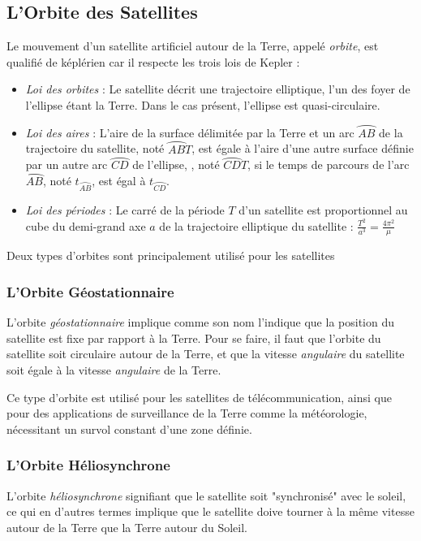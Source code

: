\documentclass[a4paper, 11pt]{report}
\begin{document}
\subsection{L'Orbite des Satellites}
Le mouvement d'un satellite artificiel autour de la Terre, appelé \emph{orbite}, est qualifié de képlérien car il respecte les trois lois de Kepler :
\begin{itemize}
	\item \emph{Loi des orbites} : Le satellite décrit une trajectoire elliptique, l'un des foyer de l'ellipse étant la Terre. Dans le cas présent, l'ellipse est quasi-circulaire.
	\item \emph{Loi des aires} : L'aire de la surface délimitée par la Terre et un arc $\wideparen{AB}$ de la trajectoire du satellite, noté $\wideparen{AB}T$, est égale à l'aire d'une autre surface définie par un autre arc $\wideparen{CD}$ de l'ellipse, , noté $\wideparen{CD}T$, si le temps de parcours de l'arc $\wideparen{AB}$, noté $t_{\wideparen{AB}}$, est égal à $t_{\wideparen{CD}}$.
	\item \emph{Loi des périodes} : Le carré de la période $T$ d'un satellite est proportionnel au cube du demi-grand axe $a$ de la trajectoire elliptique du satellite : $\frac{T^2}{a^3} = \frac{4 \pi^2}{\mu}$
\end{itemize}
Deux types d'orbites sont principalement utilisé pour les satellites
\subsubsection{L'Orbite Géostationnaire}
L'orbite \emph{géostationnaire} implique comme son nom l'indique que la position du satellite est fixe par rapport à la Terre.
Pour se faire, il faut que l'orbite du satellite soit circulaire autour de la Terre, et que la vitesse \emph{angulaire} du satellite soit égale à la vitesse \emph{angulaire} de la Terre.

Ce type d'orbite est utilisé pour les satellites de télécommunication, ainsi que pour des applications de surveillance de la Terre comme la météorologie, nécessitant un survol constant d'une zone définie.
\subsubsection{L'Orbite Héliosynchrone}
L'orbite \emph{héliosynchrone} signifiant que le satellite soit "synchronisé" avec le soleil, ce qui en d'autres termes implique que le satellite doive tourner à la même vitesse autour de la Terre que la Terre autour du Soleil.
\end{document}
